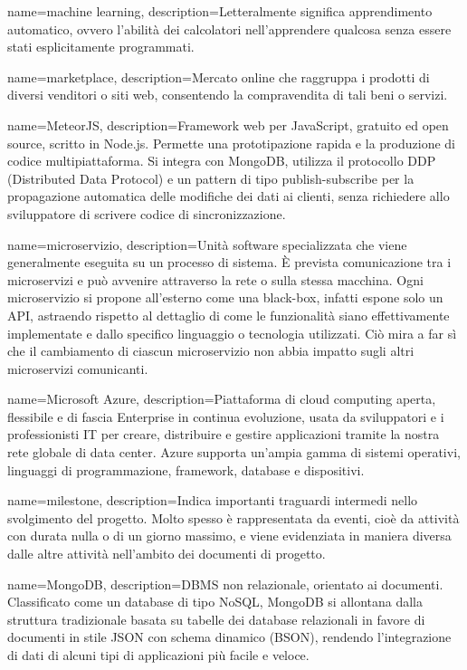 {
	name=machine learning,
	description={Letteralmente significa apprendimento automatico, ovvero l'abilità dei calcolatori nell'apprendere qualcosa senza essere stati esplicitamente programmati.}
}	

{
	name=marketplace,
	description={Mercato online che raggruppa i prodotti di diversi venditori o siti web, consentendo la compravendita di tali beni o servizi.}
}

{
	name=MeteorJS,
	description={Framework web per JavaScript, gratuito ed open source, scritto in Node.js. Permette una prototipazione rapida e la produzione di codice multipiattaforma. Si integra con MongoDB, utilizza il protocollo DDP (Distributed Data Protocol) e un pattern di tipo publish-subscribe per la propagazione automatica delle modifiche dei dati ai clienti, senza richiedere allo sviluppatore di scrivere codice di sincronizzazione.}
}		

{
	name=microservizio,
	description={Unità software specializzata che viene generalmente eseguita su un processo di sistema. \MakeUppercase{è} prevista comunicazione tra i microservizi e può avvenire attraverso la rete o sulla stessa macchina. Ogni microservizio si propone all’esterno come una black-box, infatti espone solo un API, astraendo rispetto al dettaglio di come le funzionalità siano effettivamente implementate e dallo specifico linguaggio o tecnologia utilizzati. Ciò mira a far sì che il cambiamento di ciascun microservizio non abbia impatto sugli altri microservizi comunicanti.}
}

{
	name=Microsoft Azure,
	description={Piattaforma di cloud computing aperta, flessibile e di fascia Enterprise in continua evoluzione, usata da sviluppatori e i professionisti IT per creare, distribuire e gestire applicazioni tramite la nostra rete globale di data center. Azure supporta un'ampia gamma di sistemi operativi, linguaggi di programmazione, framework, database e dispositivi.}
}	

{
	name=milestone,
	description={Indica importanti traguardi intermedi nello svolgimento del progetto. Molto spesso è rappresentata da eventi, cioè da attività con durata nulla o di un giorno massimo, e viene evidenziata in maniera diversa dalle altre attività nell'ambito dei documenti di progetto.}
}		

{
	name=MongoDB,
	description={DBMS non relazionale, orientato ai documenti. Classificato come un database di tipo NoSQL, MongoDB si allontana dalla struttura tradizionale basata su tabelle dei database relazionali in favore di documenti in stile JSON con schema dinamico (BSON), rendendo l'integrazione di dati di alcuni tipi di applicazioni più facile e veloce.}
}	

